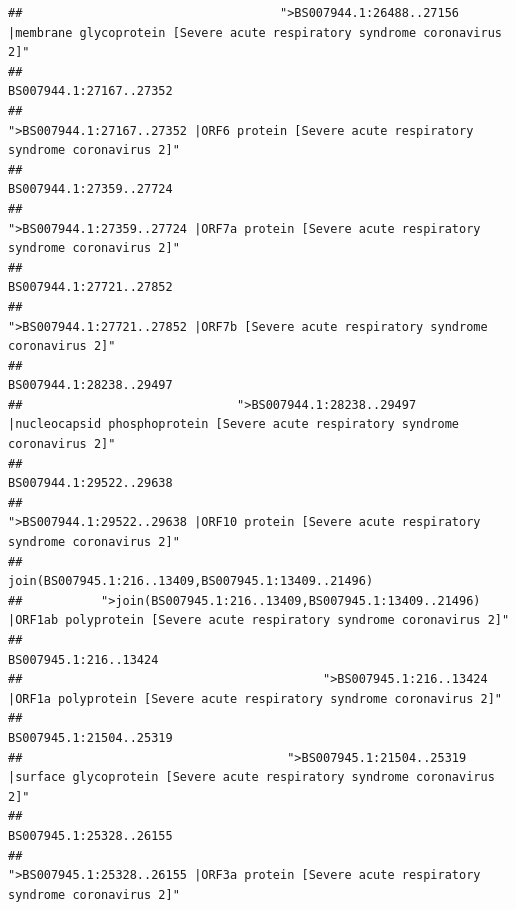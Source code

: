 \documentclass[
]{article}
\begin{document}
\begin{verbatim}
##                                    ">BS007944.1:26488..27156 |membrane glycoprotein [Severe acute respiratory syndrome coronavirus 2]" 
##                                                                                                                BS007944.1:27167..27352 
##                                             ">BS007944.1:27167..27352 |ORF6 protein [Severe acute respiratory syndrome coronavirus 2]" 
##                                                                                                                BS007944.1:27359..27724 
##                                            ">BS007944.1:27359..27724 |ORF7a protein [Severe acute respiratory syndrome coronavirus 2]" 
##                                                                                                                BS007944.1:27721..27852 
##                                                    ">BS007944.1:27721..27852 |ORF7b [Severe acute respiratory syndrome coronavirus 2]" 
##                                                                                                                BS007944.1:28238..29497 
##                              ">BS007944.1:28238..29497 |nucleocapsid phosphoprotein [Severe acute respiratory syndrome coronavirus 2]" 
##                                                                                                                BS007944.1:29522..29638 
##                                            ">BS007944.1:29522..29638 |ORF10 protein [Severe acute respiratory syndrome coronavirus 2]" 
##                                                                                    join(BS007945.1:216..13409,BS007945.1:13409..21496) 
##           ">join(BS007945.1:216..13409,BS007945.1:13409..21496) |ORF1ab polyprotein [Severe acute respiratory syndrome coronavirus 2]" 
##                                                                                                                  BS007945.1:216..13424 
##                                          ">BS007945.1:216..13424 |ORF1a polyprotein [Severe acute respiratory syndrome coronavirus 2]" 
##                                                                                                                BS007945.1:21504..25319 
##                                     ">BS007945.1:21504..25319 |surface glycoprotein [Severe acute respiratory syndrome coronavirus 2]" 
##                                                                                                                BS007945.1:25328..26155 
##                                            ">BS007945.1:25328..26155 |ORF3a protein [Severe acute respiratory syndrome coronavirus 2]" 

\end{verbatim}
\end{document}
